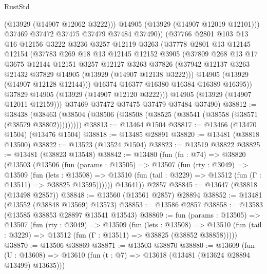 \begin{lexlean}{RustStd}
\begin{coremodule}
                (@13929 (@14907 @12062 @3222)))
              @14905
              (@13929 (@14907 @12019 @12101)))
            @37469
            @37472
            @37475
            @37479
            @37484
            @37490))
        (@37766
          @2801
          @103
          @13
          @16
          @12156
          @3222
          @3236
          @3257
          @12119
          @3263
          (@37778
            @2801
            @13
            @12145
            @12154
            (@37783
              @269
              @18
              @13
              @12145
              @12152
              @3905
              (@37809
                @268
                @13
                @17
                @3675
                @12144
                @12151
                @3257
                @12127
                @3263
                @37826
                (@37942 @12137 @3263 @21432 @37829 @14905 (@13929 (@14907 @12138 @3222)))
                @14905
                (@13929 (@14907 @12128 @12144)))
              @16374
              @16377
              @16380
              @16384
              @16389
              @16395))
          @37829
          @14905
          (@13929 (@14907 @12120 @3222)))
        @14905
        (@13929 (@14907 @12011 @12159)))
      @37469
      @37472
      @37475
      @37479
      @37484
      @37490)
@38812 := @38438
    (@38463 (@38504 (@38506 (@38508 (@38525 (@38541 (@38558 (@38571 (@38579 @38802)))))))))
@38813 := @13464 @1504
@38817 := @13466 (@13470 @1504) (@13476 @1504)
@38818 := @13485 @28891
@38820 := @13481 (@38818 @13500)
@38822 := @13523 (@13524 @1504)
@38823 := @13519 @38822
@38825 := @13481 (@38823 @13548)
@38842 := @13480
    (fun (fn : @74) =>
    @38820
      (@13503
        (@13506
          (fun (params : @13505) =>
          @13507
            (fun (rty : @3049) =>
            @13509
              (fun (lets : @13508) =>
              @13510 (fun (tail : @3229) => @13512 (fun (Γ : @13511) => @38825 @13595))))))
        @13641))
    @2857
@38845 := @13647 (@38818 (@13498 @2857))
@38848 := @13560 (@13561 @2857) @28894
@38852 := @13481 (@13552 (@38848 @13569) @13573)
@38853 := @13586 @2857
@38858 := @13583 (@13585 @38853 @28897 @13541 @13543)
@38869 := fun (params : @13505) =>
  @13507
    (fun (rty : @3049) =>
    @13509
      (fun (lets : @13508) =>
      @13510 (fun (tail : @3229) => @13512 (fun (Γ : @13511) => @38825 (@38852 @38858)))))
@38870 := @13506 @38869
@38871 := @13503 @38870
@38880 := @13609
    (fun (U : @13608) => @13610 (fun (t : @7) => @13618 (@13481 (@13624 @28894 @13499) @13635)))

\end{coremodule}
\end{lexlean}
